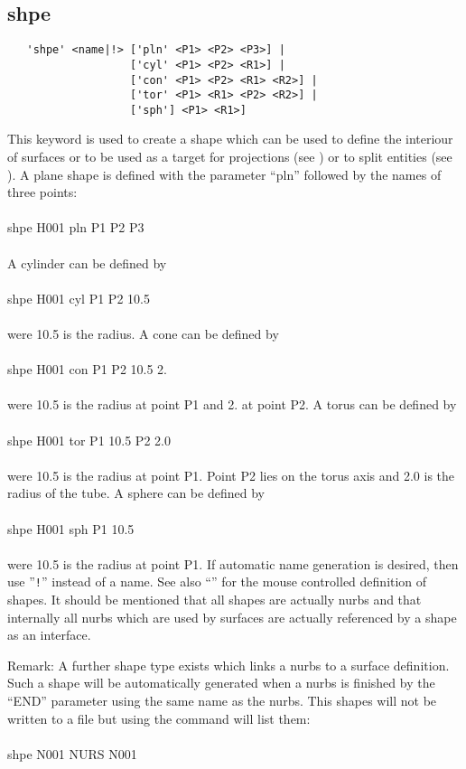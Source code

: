 \documentclass{article}
\begin{document}
\subsection{\label{shpe}shpe}
\begin{verbatim}
   'shpe' <name|!> ['pln' <P1> <P2> <P3>] |
                   ['cyl' <P1> <P2> <R1>] |
                   ['con' <P1> <P2> <R1> <R2>] |
                   ['tor' <P1> <R1> <P2> <R2>] |
                   ['sph'] <P1> <R1>]
\end{verbatim}
This keyword is used to create a shape which can be used to define the interiour of surfaces or to be used as a target for projections (see ) or to split entities (see ). A plane shape is defined with the parameter ``pln'' followed by the names of three points:\\\\shpe H001 pln P1 P2 P3\\\\A cylinder can be defined by\\\\shpe H001 cyl P1 P2 10.5\\\\were 10.5 is the radius. A cone can be defined by\\\\shpe H001 con P1 P2 10.5 2.\\\\were 10.5 is the radius at point P1 and 2. at point P2. A torus can be defined by\\\\shpe H001 tor P1 10.5 P2 2.0\\\\were 10.5 is the radius at point P1. Point P2 lies on the torus axis and 2.0 is the radius of the tube. A sphere can be defined by\\\\shpe H001 sph P1 10.5\\\\were 10.5 is the radius at point P1. If automatic name generation is desired, then use ''\verb_!_'' instead of a name. See also ``'' for the mouse controlled definition of shapes. It should be mentioned that all shapes are actually nurbs and that internally all nurbs which are used by surfaces are actually referenced by a shape as an interface.

Remark: A further shape type exists which links a nurbs to a surface definition. Such a shape will be automatically generated when a nurbs is finished by the ``END'' parameter using the same name as the nurbs. This shapes will not be written to a file but using the  command will list them:\\\\shpe N001 NURS N001
\end{document}
